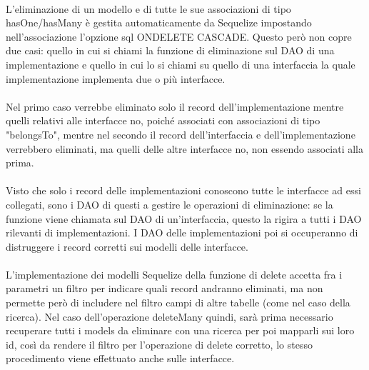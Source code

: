 \documentclass[a4paper, 12pt]{report}
\begin{document}
      \paragraph*{}
      L'eliminazione di un modello e di tutte le sue associazioni di tipo hasOne/hasMany è gestita automaticamente da Sequelize impostando nell'associazione l'opzione sql ONDELETE CASCADE.
      Questo però non copre due casi: quello in cui si chiami la funzione di eliminazione sul DAO di una implementazione e quello in cui lo si chiami su quello di una interfaccia la quale implementazione implementa due o più interfacce.
      \paragraph*{}
      Nel primo caso verrebbe eliminato solo il record dell'implementazione mentre quelli relativi alle interfacce no, poiché associati con associazioni di tipo "belongsTo", mentre nel secondo il record dell'interfaccia e dell'implementazione verrebbero eliminati, ma quelli delle altre interfacce no, non essendo associati alla prima.
      \paragraph*{}
      Visto che solo i record delle implementazioni conoscono tutte le interfacce ad essi collegati, sono i DAO di questi a gestire le operazioni di eliminazione: se la funzione viene chiamata sul DAO di un'interfaccia, questo la rigira a tutti i DAO rilevanti di implementazioni.
      I DAO delle implementazioni poi si occuperanno di distruggere i record corretti sui modelli delle interfacce.
      \paragraph*{}
      L'implementazione dei modelli Sequelize della funzione di delete accetta fra i parametri un filtro per indicare quali record andranno eliminati, ma non permette però di includere nel filtro campi di altre tabelle (come nel caso della ricerca).
      Nel caso dell'operazione deleteMany quindi, sarà prima necessario recuperare tutti i models da eliminare con una ricerca per poi mapparli sui loro id, così da rendere il filtro per l'operazione di delete corretto, lo stesso procedimento viene effettuato anche sulle interfacce.
    \newpage
\end{document}
